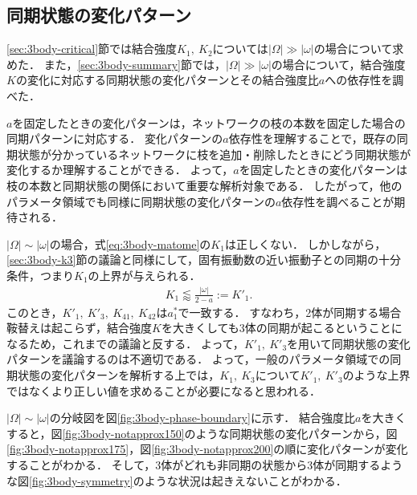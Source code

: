 \documentclass[../main]{subfiles}
\begin{document}
\subsection{同期状態の変化パターン}
\ref{sec:3body-critical}節では結合強度$K_1,\ K_2$については$|\Omega|\gg|\omega|$の場合について求めた．
また，\ref{sec:3body-summary}節では，$|\Omega|\gg|\omega|$の場合について，結合強度$K$の変化に対応する同期状態の変化パターンとその結合強度比$a$への依存性を調べた．

$a$を固定したときの変化パターンは，ネットワークの枝の本数を固定した場合の同期パターンに対応する．
変化パターンの$a$依存性を理解することで，既存の同期状態が分かっているネットワークに枝を追加・削除したときにどう同期状態が変化するか理解することができる．
よって，$a$を固定したときの変化パターンは枝の本数と同期状態の関係において重要な解析対象である．
したがって，他のパラメータ領域でも同様に同期状態の変化パターンの$a$依存性を調べることが期待される．

$|\Omega|\sim|\omega|$の場合，式\eqref{eq:3body-matome}の$K_1$は正しくない．
しかしながら，\ref{sec:3body-k3}節の議論と同様にして，固有振動数の近い振動子との同期の十分条件，つまり$K_1$の上界が与えられる．
\begin{align}
    \label{K1-approx-dash}
    K_1\lessapprox\frac{|\omega|}{2-a}:=K'_1.
\end{align}
このとき，$K'_1,\ K'_3,\ K_{41},\ K_{42}$は$a^\ast_1$で一致する．
すなわち，2体が同期する場合鞍替えは起こらず，結合強度$K$を大きくしても3体の同期が起こるということになるため，これまでの議論と反する．
よって，$K'_1,\ K'_3$を用いて同期状態の変化パターンを議論するのは不適切である．
よって，一般のパラメータ領域での同期状態の変化パターンを解析する上では，$K_1,\ K_3$について$K'_1,\ K'_3$のような上界ではなくより正しい値を求めることが必要になると思われる．

$|\Omega|\sim|\omega|$の分岐図を図\ref{fig:3body-phase-boundary}に示す．
結合強度比$a$を大きくすると，図\ref{fig:3body-notapprox150}のような同期状態の変化パターンから，図\ref{fig:3body-notapprox175}，図\ref{fig:3body-notapprox200}の順に変化パターンが変化することがわかる．
そして，3体がどれも非同期の状態から3体が同期するような図\ref{fig:3body-symmetry}のような状況は起きえないことがわかる．
\end{document}
